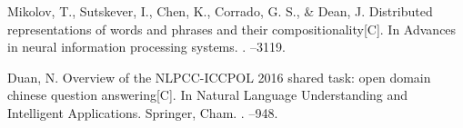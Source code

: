 \begin{thebibliography}{10}
Mikolov, T., Sutskever, I., Chen, K., Corrado, G. S., \& Dean, J.
\newblock Distributed representations of words and phrases and their compositionality[C].
\newblock In Advances in neural information processing systems.
.
--3119.

Duan, N.
\newblock Overview of the NLPCC-ICCPOL 2016 shared task: open domain chinese question answering[C].
\newblock In Natural Language Understanding and Intelligent
Applications. Springer, Cham.
.
--948.

\end{thebibliography}
